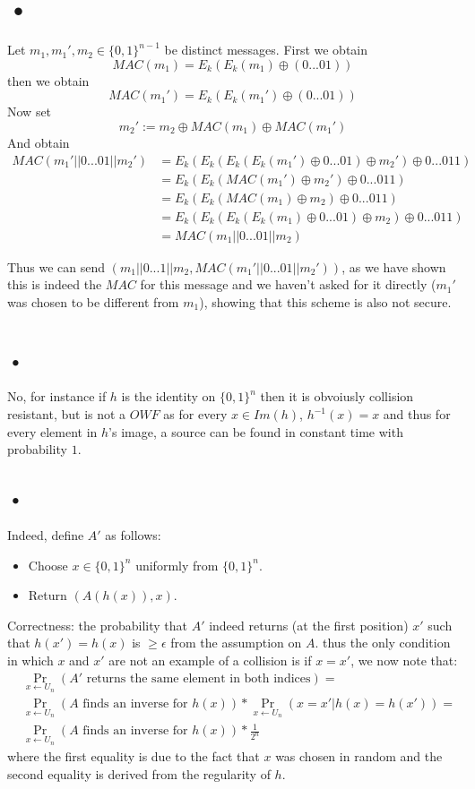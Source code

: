 \documentclass{article}
\begin{document}
\section{•}
Let $m_1,m_1', m_2\in \{0,1\}^{n-1}$ be distinct messages. First we obtain 
\[MAC(m_1) = E_k(E_k(m_1) \oplus(0...01))\]
 then we obtain 
\[MAC(m_1') = E_k(E_k(m_1') \oplus(0...01))\]
Now set 
\[m_2' := m_2 \oplus  MAC(m_1)  \oplus  MAC(m_1')\]
And obtain 
\begin{align*}
MAC(m_1'|| 0...01|| m_2') &= E_k( E_k( E_k(E_k(m_1')\oplus 0...01 ) \oplus m_2')\oplus 0...011)\\
 &= E_k( E_k( MAC(m_1') \oplus m_2')\oplus 0...011)\\
 &= E_k( E_k( MAC(m_1) \oplus m_2)\oplus 0...011)\\
 &= E_k( E_k( E_k(E_k(m_1)\oplus 0...01 ) \oplus m_2)\oplus 0...011)\\
 &= MAC(m_1||0...01||m_2)
\end{align*}

Thus we can send $(m_1||0...1|| m_2 , MAC(m_1'|| 0...01|| m_2'))$, as we have shown this is indeed the $MAC$ for this message and we haven't asked for it directly ($m_1'$ was  chosen to be different from $m_1$), showing that this scheme is also not secure.

\section{}
\subsection{•}
No, for instance if $h$ is the identity on $\{0,1\}^n$ then it is obvoiusly collision resistant, but is not a $OWF$ as for every $x \in Im(h)$, $h^{-1}(x) = x$ and thus for every element in $h$'s image, a source can be found in constant time with probability $1$. 

\subsection{•}
Indeed, define $A'$ as follows:
\begin{itemize}
\item Choose $x \in \{0,1\}^n$ uniformly from $\{0,1\}^n$.
\item Return $(A(h(x)), x)$.
\end{itemize}
Correctness: the probability that $A'$ indeed returns (at the first position) $x'$ such that $h(x') = h(x)$ is $\geq \epsilon$ from the assumption on $A$. thus the only condition in which $x$ and $x'$ are not an example of a collision is if $x = x'$,  we now note that:
\begin{align*}
&\Pr_{x \leftarrow U_n}(A' \mbox{ returns the same element in both indices}) =\\
&\Pr_{x \leftarrow U_n}(A \mbox{ finds an inverse for } h(x)) * \Pr_{x \leftarrow U_n}(x = x' | h(x) = h(x')) =\\
& \Pr_{x \leftarrow U_n}(A \mbox{ finds an inverse for } h(x)) * \frac{1}{2^n}
\end{align*}
where the first equality is due to the fact that $x$ was chosen in random and the second equality is derived from the regularity of $h$. 
\end{document}

